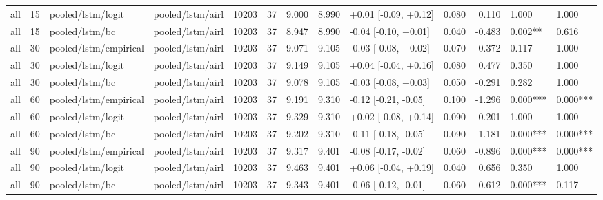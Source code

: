 \begin{tabular}{lrllrrrrlrrll}
all & 15 & pooled/lstm/logit & pooled/lstm/airl & 10203 & 37 & 9.000 & 8.990 & +0.01 [-0.09, +0.12] & 0.080 & 0.110 & 1.000 & 1.000 \\
all & 15 & pooled/lstm/bc & pooled/lstm/airl & 10203 & 37 & 8.947 & 8.990 & -0.04 [-0.10, +0.01] & 0.040 & -0.483 & 0.002** & 0.616 \\
all & 30 & pooled/lstm/empirical & pooled/lstm/airl & 10203 & 37 & 9.071 & 9.105 & -0.03 [-0.08, +0.02] & 0.070 & -0.372 & 0.117 & 1.000 \\
all & 30 & pooled/lstm/logit & pooled/lstm/airl & 10203 & 37 & 9.149 & 9.105 & +0.04 [-0.04, +0.16] & 0.080 & 0.477 & 0.350 & 1.000 \\
all & 30 & pooled/lstm/bc & pooled/lstm/airl & 10203 & 37 & 9.078 & 9.105 & -0.03 [-0.08, +0.03] & 0.050 & -0.291 & 0.282 & 1.000 \\
all & 60 & pooled/lstm/empirical & pooled/lstm/airl & 10203 & 37 & 9.191 & 9.310 & -0.12 [-0.21, -0.05] & 0.100 & -1.296 & 0.000*** & 0.000*** \\
all & 60 & pooled/lstm/logit & pooled/lstm/airl & 10203 & 37 & 9.329 & 9.310 & +0.02 [-0.08, +0.14] & 0.090 & 0.201 & 1.000 & 1.000 \\
all & 60 & pooled/lstm/bc & pooled/lstm/airl & 10203 & 37 & 9.202 & 9.310 & -0.11 [-0.18, -0.05] & 0.090 & -1.181 & 0.000*** & 0.000*** \\
all & 90 & pooled/lstm/empirical & pooled/lstm/airl & 10203 & 37 & 9.317 & 9.401 & -0.08 [-0.17, -0.02] & 0.060 & -0.896 & 0.000*** & 0.000*** \\
all & 90 & pooled/lstm/logit & pooled/lstm/airl & 10203 & 37 & 9.463 & 9.401 & +0.06 [-0.04, +0.19] & 0.040 & 0.656 & 0.350 & 1.000 \\
all & 90 & pooled/lstm/bc & pooled/lstm/airl & 10203 & 37 & 9.343 & 9.401 & -0.06 [-0.12, -0.01] & 0.060 & -0.612 & 0.000*** & 0.117 \\
\bottomrule
\end{tabular}
